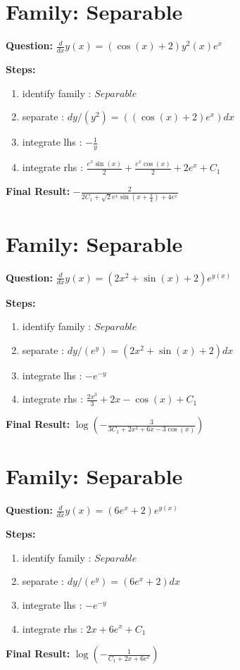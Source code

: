 \documentclass{article}
\begin{document}
\section*{Family: Separable}
\textbf{Question:} $\frac{d}{d x} y{\left(x \right)} = \left(\cos{\left(x \right)} + 2\right) y^{2}{\left(x \right)} e^{x}$

\textbf{Steps:}
\begin{enumerate}
\item identify family :  $Separable$
\item separate :  $dy / (y^{2}) = (\left(\cos{\left(x \right)} + 2\right) e^{x}) dx$
\item integrate lhs :  $- \frac{1}{y}$
\item integrate rhs :  $\frac{e^{x} \sin{\left(x \right)}}{2} + \frac{e^{x} \cos{\left(x \right)}}{2} + 2 e^{x} + C_1$
\end{enumerate}
\textbf{Final Result:} $- \frac{2}{2 C_{1} + \sqrt{2} e^{x} \sin{\left(x + \frac{\pi}{4} \right)} + 4 e^{x}}$

\section*{Family: Separable}
\textbf{Question:} $\frac{d}{d x} y{\left(x \right)} = \left(2 x^{2} + \sin{\left(x \right)} + 2\right) e^{y{\left(x \right)}}$

\textbf{Steps:}
\begin{enumerate}
\item identify family :  $Separable$
\item separate :  $dy / (e^{y}) = (2 x^{2} + \sin{\left(x \right)} + 2) dx$
\item integrate lhs :  $- e^{- y}$
\item integrate rhs :  $\frac{2 x^{3}}{3} + 2 x - \cos{\left(x \right)} + C_1$
\end{enumerate}
\textbf{Final Result:} $\log{\left(- \frac{3}{3 C_{1} + 2 x^{3} + 6 x - 3 \cos{\left(x \right)}} \right)}$

\section*{Family: Separable}
\textbf{Question:} $\frac{d}{d x} y{\left(x \right)} = \left(6 e^{x} + 2\right) e^{y{\left(x \right)}}$

\textbf{Steps:}
\begin{enumerate}
\item identify family :  $Separable$
\item separate :  $dy / (e^{y}) = (6 e^{x} + 2) dx$
\item integrate lhs :  $- e^{- y}$
\item integrate rhs :  $2 x + 6 e^{x} + C_1$
\end{enumerate}
\textbf{Final Result:} $\log{\left(- \frac{1}{C_{1} + 2 x + 6 e^{x}} \right)}$
\end{document}
